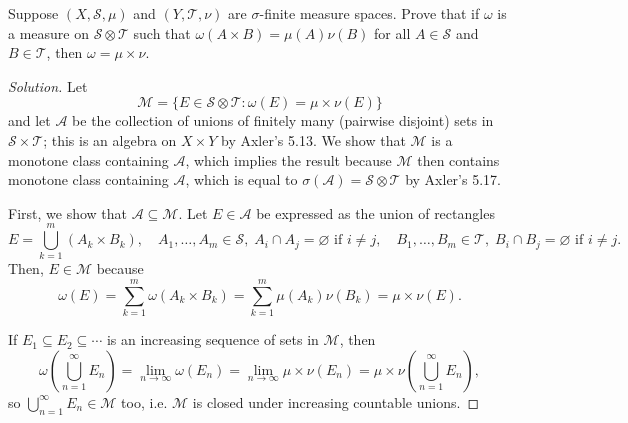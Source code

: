 \documentclass[10pt]{article}
\newenvironment{soln}{\begin{proof}[Solution]}{\end{proof}}
\begin{document}
\begin{problem}
    [Axler 5A \#10]
    Suppose $(X,\mathcal S,\mu)$ and $(Y,\mathcal T,\nu)$
    are $\sigma$-finite measure spaces. Prove that if
    $\omega$ is a measure on $\mathcal S\otimes\mathcal T$
    such that $\omega(A\times B) = \mu(A)\nu(B)$
    for all $A\in\mathcal S$ and $B\in\mathcal T$,
    then $\omega = \mu\times\nu$.
\end{problem}

\begin{soln}
    Let
    \begin{equation*}
	\mathcal M = \{ E\in\mathcal S\otimes\mathcal T :
	\omega(E) = \mu\times\nu(E)\}
    \end{equation*}
    and let $\mathcal A$ be the collection of
    unions of finitely many (pairwise disjoint) sets in $\mathcal S\times\mathcal T$;
    this is an algebra on $X\times Y$ by Axler's 5.13.
    We show that $\mathcal M$ is a monotone class containing
    $\mathcal A$, which implies the result
    because $\mathcal M$ then contains monotone class containing $\mathcal A$,
    which is equal to $\sigma(\mathcal A) = \mathcal S\otimes\mathcal T$
    by Axler's 5.17.

    First, we show that $\mathcal A\subseteq\mathcal M$.
    Let $E\in\mathcal A$ be expressed as the union of rectangles
    \begin{equation*}
	E = \bigcup_{k=1}^m (A_k\times B_k),\quad
	A_1,\dots,A_m\in\mathcal S,\; A_i\cap A_j=\varnothing\text{ if }i\ne j,\quad
	B_1,\dots,B_m\in\mathcal T,\; B_i\cap B_j=\varnothing\text{ if }i\ne j.
    \end{equation*}
    Then, $E\in\mathcal M$ because
    \begin{equation*}
	\omega(E) = \sum_{k=1}^m \omega(A_k\times B_k)
	= \sum_{k=1}^m \mu(A_k)\nu(B_k)
	= \mu\times\nu(E).
    \end{equation*}

    If $E_1\subseteq E_2\subseteq\cdots$ is
    an increasing sequence of sets in $\mathcal M$, then
    \begin{equation*}
	\omega\left(\bigcup_{n=1}^\infty E_n\right)
	= \lim_{n\to\infty} \omega(E_n)
	= \lim_{n\to\infty} \mu\times\nu(E_n)
	= \mu\times\nu\left(\bigcup_{n=1}^\infty E_n\right),
    \end{equation*}
    so $\bigcup_{n=1}^\infty E_n\in\mathcal M$ too,
    i.e. $\mathcal M$ is closed under increasing countable unions.


\end{soln}
\end{document}
